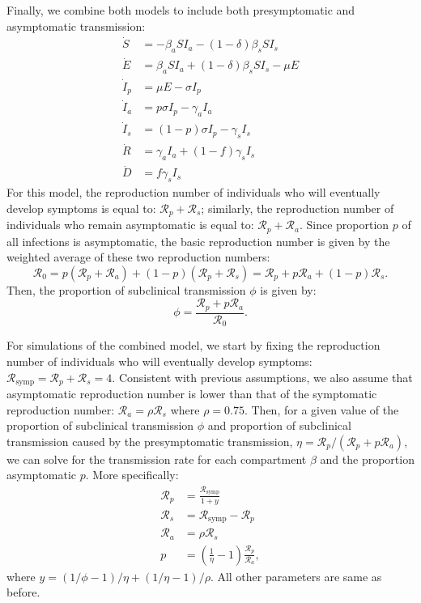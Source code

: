 \documentclass[12pt]{article}
\newcommand{\RR}{\ensuremath{{\mathcal R}}\xspace}
\begin{document}
Finally, we combine both models to include both presymptomatic and asymptomatic transmission:
\begin{align}
\dot{S} &= -\beta_a S I_a -(1-\delta) \beta_s S I_s \\
\dot{E} &= \beta_a S I_a + (1-\delta) \beta_s S I_s - \mu E\\
\dot{I}_p &= \mu E - \sigma I_p\\
\dot{I}_a &= p \sigma I_p - \gamma_a I_a\\
\dot{I}_s &= (1-p) \sigma I_p -\gamma_s I_s\\
\dot{R} &= \gamma_a I_a + (1-f) \gamma_s I_s \\
\dot{D} &= f \gamma_s I_s
\end{align}
For this model, the reproduction number of individuals who will eventually develop symptoms is equal to: $\RR_p + \RR_s$;
similarly, the reproduction number of individuals who remain asymptomatic is equal to: $\RR_p + \RR_a$.
Since proportion $p$ of all infections is asymptomatic, the basic reproduction number is given by the weighted average of these two reproduction numbers: 
\begin{equation}
\RR_0 = p(\RR_p + \RR_a) + (1-p) (\RR_p + \RR_s) = \RR_p + p \RR_a + (1-p) \RR_s.
\end{equation}
Then, the proportion of subclinical transmission $\phi$ is given by:
\begin{equation}
\phi = \frac{\RR_p + p \RR_a}{\RR_0}.
\end{equation}

For simulations of the combined model, we start by fixing the reproduction number of individuals who will eventually develop symptoms: $\RR_{\textrm{symp}} = \RR_p + \RR_s = 4$. 
Consistent with previous assumptions, we also assume that asymptomatic reproduction number is lower than that of the symptomatic reproduction number: $\RR_a = \rho \RR_s$ where $\rho = 0.75$.
Then, for a given value of the proportion of subclinical transmission $\phi$ and proportion of subclinical transmission caused by the presymptomatic transmission, $\eta = \RR_p/(\RR_p + p \RR_a)$, we can solve for the transmission rate for each compartment $\beta$ and the proportion asymptomatic $p$.
More specifically:
\begin{align}
\RR_p &= \frac{\RR_{\textrm{symp}}}{1 + y}\\
\RR_s &= \RR_{\textrm{symp}} - \RR_p\\
\RR_a &=  \rho \RR_s\\
p &= \left(\frac{1}{\eta} - 1 \right) \frac{\RR_p}{\RR_a},
\end{align}
where $y = (1/\phi - 1)/\eta + (1/\eta - 1)/\rho$.
All other parameters are same as before.
\end{document}
